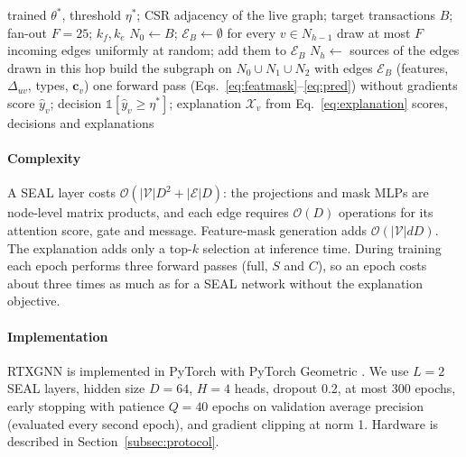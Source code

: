 \begin{algorithm}[!t]
\caption{RTXGNN inference for a request (as implemented in \texttt{rtxgnn/serving.py}).}
\label{alg:inference}
\begin{algorithmic}[1]
\REQUIRE trained $\theta^\ast$, threshold $\eta^\ast$; CSR adjacency of the live graph; target transactions $B$; fan-out $F=25$; $k_f,k_e$
\STATE $N_0\gets B$; $\mathcal{E}_B\gets\emptyset$
  \STATE for every $v\in N_{h-1}$ draw at most $F$ incoming edges uniformly at random; add them to $\mathcal{E}_B$
  \STATE $N_h\gets$ sources of the edges drawn in this hop
\ENDFOR
\STATE build the subgraph on $N_0\cup N_1\cup N_2$ with edges $\mathcal{E}_B$ (features, $\Delta_{uv}$, types, $\mathbf{c}_v$)
\STATE one forward pass (Eqs.~\ref{eq:featmask}--\ref{eq:pred}) without gradients
  \STATE score $\hat y_v$; decision $\mathbb{1}[\hat y_v\ge\eta^\ast]$; explanation $\mathcal{X}_v$ from Eq.~\ref{eq:explanation}
\ENDFOR
\RETURN scores, decisions and explanations
\end{algorithmic}
\end{algorithm}

\paragraph{Complexity} A SEAL layer costs $\mathcal{O}(|\mathcal{V}|D^2+|\mathcal{E}|D)$: the projections and mask MLPs are node-level matrix products, and each edge requires $\mathcal{O}(D)$ operations for its attention score, gate and message. Feature-mask generation adds $\mathcal{O}(|\mathcal{V}|dD)$. The explanation adds only a top-$k$ selection at inference time. During training each epoch performs three forward passes (full, $S$ and $C$), so an epoch costs about three times as much as for a SEAL network without the explanation objective.

\paragraph{Implementation} RTXGNN is implemented in PyTorch \citep{paszke2019pytorch} with PyTorch Geometric \citep{fey2019fast}. We use $L=2$ SEAL layers, hidden size $D=64$, $H=4$ heads, dropout 0.2, at most 300 epochs, early stopping with patience $Q=40$ epochs on validation average precision (evaluated every second epoch), and gradient clipping at norm 1. Hardware is described in Section~\ref{subsec:protocol}.
